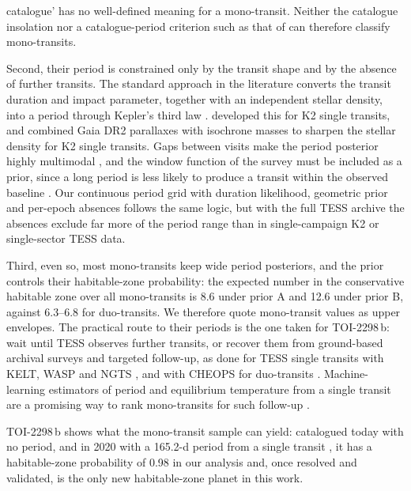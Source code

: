 \documentclass[fleqn,usenatbib]{mnras}
\begin{document}
catalogue' has no well-defined meaning for a mono-transit. Neither the catalogue insolation nor a catalogue-period criterion such as that of \citet{Kaltenegger2021} can therefore classify mono-transits.

Second, their period is constrained only by the transit shape and by the absence of further transits. The standard approach in the literature converts the transit duration and impact parameter, together with an independent stellar density, into a period through Kepler's third law \citep{Winn2010,Wang2015,Kipping2018}. \citet{Osborn2016} developed this for K2 single transits, and \citet{Sandford2019} combined Gaia DR2 parallaxes with isochrone masses to sharpen the stellar density for K2 single transits. Gaps between visits make the period posterior highly multimodal \citep{Dholakia2020}, and the window function of the survey must be included as a prior, since a long period is less likely to produce a transit within the observed baseline \citep[e.g.][]{Vanderburg2018,Rizzuto2020}. Our continuous period grid with duration likelihood, geometric prior and per-epoch absences follows the same logic, but with the full TESS archive the absences exclude far more of the period range than in single-campaign K2 or single-sector TESS data.

Third, even so, most mono-transits keep wide period posteriors, and the prior controls their habitable-zone probability: the expected number in the conservative habitable zone over all mono-transits is 8.6 under prior A and 12.6 under prior B, against 6.3--6.8 for duo-transits. We therefore quote mono-transit values as upper envelopes. The practical route to their periods is the one taken for TOI-2298\,b: wait until TESS observes further transits, or recover them from ground-based archival surveys and targeted follow-up, as done for TESS single transits with KELT, WASP and NGTS \citep{Yao2019,Gill2020}, and with CHEOPS for duo-transits \citep{Osborn2022}. Machine-learning estimators of period and equilibrium temperature from a single transit are a promising way to rank mono-transits for such follow-up \citep{Javed2026}.

TOI-2298\,b shows what the mono-transit sample can yield: catalogued today with no period, and in 2020 with a 165.2-d period from a single transit \citep{Kaltenegger2021}, it has a habitable-zone probability of 0.98 in our analysis and, once resolved and validated, is the only new habitable-zone planet in this work.

\end{document}
